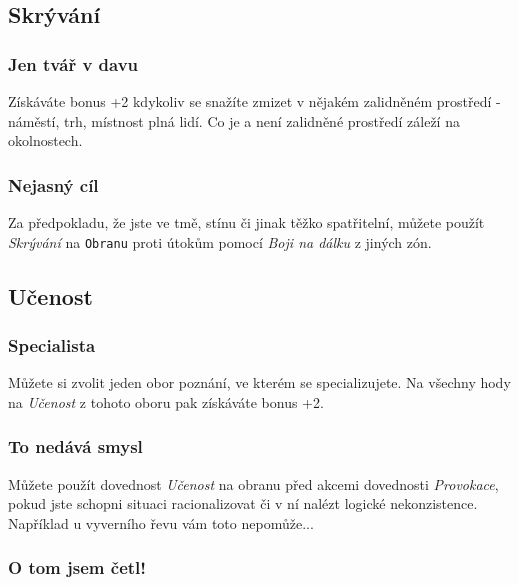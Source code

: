 \subsection{Skrývání}
\label{sec:trik-skryvani}

\subsubsection{Jen tvář v davu}
\label{sec:skryvani-tvar}

Získáváte bonus +2 kdykoliv se snažíte zmizet v nějakém zalidněném prostředí - náměstí, trh, místnost plná lidí. Co je a není zalidněné prostředí záleží na okolnostech.

\subsubsection{Nejasný cíl}
\label{sec:skryvani-nejasny}

Za předpokladu, že jste ve tmě, stínu či jinak těžko spatřitelní, můžete použít \textit{Skrývání} na \texttt{Obranu} proti útokům pomocí \textit{Boji na dálku} z jiných zón.

\subsection{Učenost}
\label{sec:trik-ucenost}

\subsubsection{Specialista}
\label{sec:ucenost-specialista}

Můžete si zvolit jeden obor poznání, ve kterém se specializujete. Na všechny hody na \textit{Učenost} z tohoto oboru pak získáváte bonus +2.

\subsubsection{To nedává smysl}
\label{sec:ucenost-smysl}

Můžete použít dovednost \textit{Učenost} na obranu před akcemi dovednosti \textit{Provokace}, pokud jste schopni situaci racionalizovat či v ní nalézt logické nekonzistence. Například u vyverního řevu vám toto nepomůže...

\subsubsection{O tom jsem četl!}
\label{sec:ucenost-cetl}

